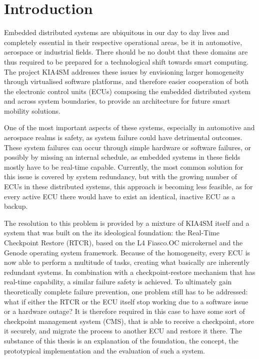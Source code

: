 
\chapter{Introduction}\label{chapter:introduction}

Embedded distributed systems are ubiquitous in our day to day lives and completely essential in their respective operational areas, be it in automotive, aerospace or industrial fields. There should be no doubt that these domains are thus required to be prepared for a technological shift towards smart computing. The project KIA4SM addresses these issues by envisioning larger homogeneity through virtualised software platforms, and therefore easier cooperation of both the electronic control units (ECUs) composing the embedded distributed system and across system boundaries, to provide an architecture for future smart mobility solutions. 

One of the most important aspects of these systems, especially in automotive and aerospace realms is safety, as system failure could have detrimental outcomes. These system failures can occur through simple hardware or software failures, or possibly by missing an internal schedule, as embedded systems in these fields mostly have to be real-time capable. Currently, the most common solution for this issue is covered by system redundancy, but with the growing number of ECUs in these distributed systems, this approach is becoming less feasible, as for every active ECU there would have to exist an identical, inactive ECU as a backup.

The resolution to this problem is provided by a mixture of KIA4SM itself and a system that was built on the its ideological foundation: the Real-Time Checkpoint Restore (RTCR), based on the L4 Fiasco.OC microkernel and the Genode operating system framework. Because of the homogeneity, every ECU is now able to perform a multitude of tasks, creating what basically are inherently redundant systems. In combination with a checkpoint-restore mechanism that has real-time capability, a similar failure safety is achieved. To ultimately gain theoretically complete failure prevention, one problem still has to be addressed: what if either the RTCR or the ECU itself stop working due to a software issue or a hardware outage? It is therefore required in this case to have some sort of checkpoint management system (CMS), that is able to receive a checkpoint, store it securely, and migrate the process to another ECU and restore it there.
The substance of this thesis is an explanation of the foundation, the concept, the prototypical implementation and the evaluation of such a system. \cite{kia4sm} \cite{rtcr}


